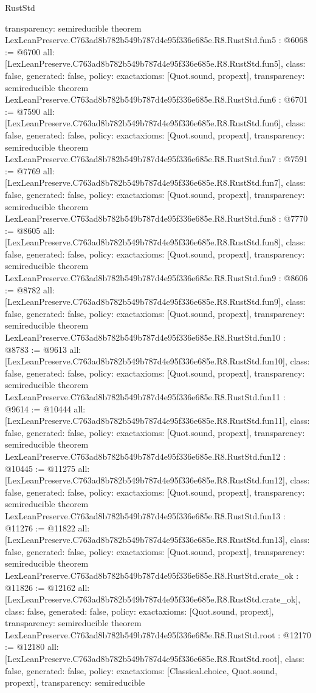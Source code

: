 \begin{lexlean}{RustStd}
\begin{coremodule}
{  transparency: semireducible
}
theorem LexLeanPreserve.C763ad8b782b549b787d4e95f336e685e.R8.RustStd.fun5 : @6068 := @6700 {
  all: [LexLeanPreserve.C763ad8b782b549b787d4e95f336e685e.R8.RustStd.fun5],
  class: false,
  generated: false,
  policy: exact{axioms: [Quot.sound, propext]},
  transparency: semireducible
}
theorem LexLeanPreserve.C763ad8b782b549b787d4e95f336e685e.R8.RustStd.fun6 : @6701 := @7590 {
  all: [LexLeanPreserve.C763ad8b782b549b787d4e95f336e685e.R8.RustStd.fun6],
  class: false,
  generated: false,
  policy: exact{axioms: [Quot.sound, propext]},
  transparency: semireducible
}
theorem LexLeanPreserve.C763ad8b782b549b787d4e95f336e685e.R8.RustStd.fun7 : @7591 := @7769 {
  all: [LexLeanPreserve.C763ad8b782b549b787d4e95f336e685e.R8.RustStd.fun7],
  class: false,
  generated: false,
  policy: exact{axioms: [Quot.sound, propext]},
  transparency: semireducible
}
theorem LexLeanPreserve.C763ad8b782b549b787d4e95f336e685e.R8.RustStd.fun8 : @7770 := @8605 {
  all: [LexLeanPreserve.C763ad8b782b549b787d4e95f336e685e.R8.RustStd.fun8],
  class: false,
  generated: false,
  policy: exact{axioms: [Quot.sound, propext]},
  transparency: semireducible
}
theorem LexLeanPreserve.C763ad8b782b549b787d4e95f336e685e.R8.RustStd.fun9 : @8606 := @8782 {
  all: [LexLeanPreserve.C763ad8b782b549b787d4e95f336e685e.R8.RustStd.fun9],
  class: false,
  generated: false,
  policy: exact{axioms: [Quot.sound, propext]},
  transparency: semireducible
}
theorem LexLeanPreserve.C763ad8b782b549b787d4e95f336e685e.R8.RustStd.fun10 : @8783 := @9613 {
  all: [LexLeanPreserve.C763ad8b782b549b787d4e95f336e685e.R8.RustStd.fun10],
  class: false,
  generated: false,
  policy: exact{axioms: [Quot.sound, propext]},
  transparency: semireducible
}
theorem LexLeanPreserve.C763ad8b782b549b787d4e95f336e685e.R8.RustStd.fun11 : @9614 := @10444 {
  all: [LexLeanPreserve.C763ad8b782b549b787d4e95f336e685e.R8.RustStd.fun11],
  class: false,
  generated: false,
  policy: exact{axioms: [Quot.sound, propext]},
  transparency: semireducible
}
theorem LexLeanPreserve.C763ad8b782b549b787d4e95f336e685e.R8.RustStd.fun12 : @10445 := @11275 {
  all: [LexLeanPreserve.C763ad8b782b549b787d4e95f336e685e.R8.RustStd.fun12],
  class: false,
  generated: false,
  policy: exact{axioms: [Quot.sound, propext]},
  transparency: semireducible
}
theorem LexLeanPreserve.C763ad8b782b549b787d4e95f336e685e.R8.RustStd.fun13 : @11276 := @11822 {
  all: [LexLeanPreserve.C763ad8b782b549b787d4e95f336e685e.R8.RustStd.fun13],
  class: false,
  generated: false,
  policy: exact{axioms: [Quot.sound, propext]},
  transparency: semireducible
}
theorem LexLeanPreserve.C763ad8b782b549b787d4e95f336e685e.R8.RustStd.crate_ok : @11826 := @12162 {
  all: [LexLeanPreserve.C763ad8b782b549b787d4e95f336e685e.R8.RustStd.crate_ok],
  class: false,
  generated: false,
  policy: exact{axioms: [Quot.sound, propext]},
  transparency: semireducible
}
theorem LexLeanPreserve.C763ad8b782b549b787d4e95f336e685e.R8.RustStd.root : @12170 := @12180 {
  all: [LexLeanPreserve.C763ad8b782b549b787d4e95f336e685e.R8.RustStd.root],
  class: false,
  generated: false,
  policy: exact{axioms: [Classical.choice, Quot.sound, propext]},
  transparency: semireducible
}


\end{coremodule}
\end{lexlean}
